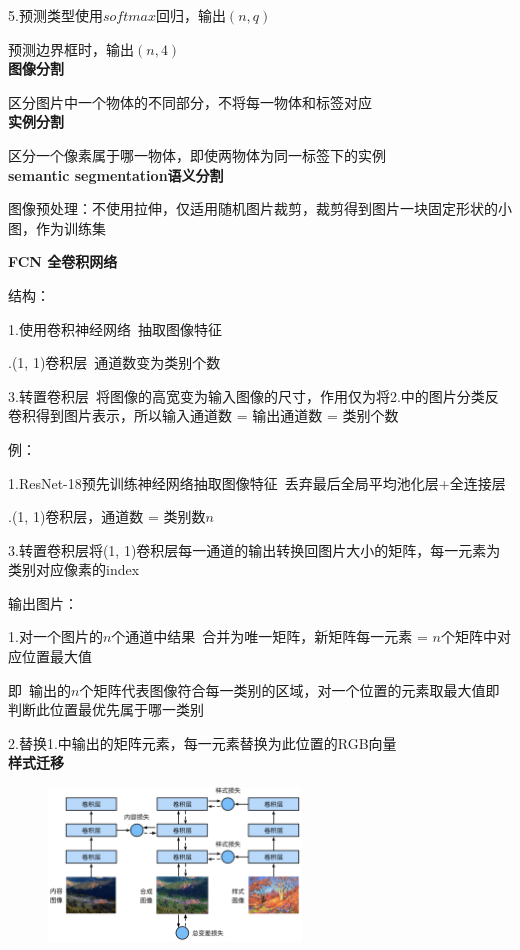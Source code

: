 \documentclass[UTF8]{ctexart}
\begin{document}
  \quad 5.预测类型使用$softmax回归$，输出$(n, q)$

  \quad \quad 预测边界框时，输出$(n, 4)$\\
\textbf{图像分割}

  区分图片中一个物体的不同部分，不将每一物体和标签对应\\
\textbf{实例分割}

  区分一个像素属于哪一物体，即使两物体为同一标签下的实例\\
\textbf{semantic segmentation语义分割}

  图像预处理：不使用拉伸，仅适用随机图片裁剪，裁剪得到图片一块固定形状的小图，作为训练集

  \textbf{FCN 全卷积网络}

  \quad 结构：
  
  \quad \quad 1.使用卷积神经网络\ 抽取图像特征

  \quad {}.(1, 1)卷积层\ 通道数变为类别个数

  \quad \quad 3.转置卷积层\ 将图像的高宽变为输入图像的尺寸，作用仅为将2.中的图片分类反卷积得到图片表示，所以输入通道数 = 输出通道数 = 类别个数

  \quad 例：

  \quad \quad 1.ResNet-18预先训练神经网络抽取图像特征\ 丢弃最后全局平均池化层+全连接层

  \quad {}.(1, 1)卷积层，通道数 = 类别数$n$
  
  \quad \quad 3.转置卷积层将(1, 1)卷积层每一通道的输出转换回图片大小的矩阵，每一元素为类别对应像素的index

  \quad 输出图片：
  
  \quad \quad 1.对一个图片的$n$个通道中结果\ 合并为唯一矩阵，新矩阵每一元素 = $n$个矩阵中对应位置最大值

  \quad \quad \quad 即\ 输出的$n$个矩阵代表图像符合每一类别的区域，对一个位置的元素取最大值即判断此位置最优先属于哪一类别
  
  \quad \quad 2.替换1.中输出的矩阵元素，每一元素替换为此位置的RGB向量\\
\textbf{样式迁移}

  \begin{figure}[H] %
    \centering %
    \includegraphics[width=0.6\textwidth]{note_images/style-transfer.png} %
  \end{figure}
\end{document}
